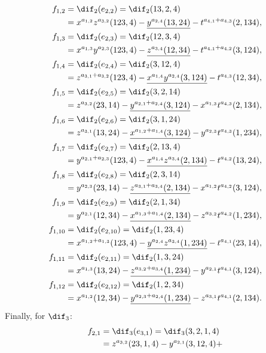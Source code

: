 \begin{example}
\begin{align*}
f_{1,2}&=  \dif_2(e_{2,2})=\dif_2(13,2,4)\\ 
&= x^{a_{1,2}}z^{a_{3,2}}(123,4)-\underline{y^{a_{2,4}}(13,24)}-
t^{a_{4,1}+a_{4,3}}(2,134),\\
f_{1,3}&= \dif_2(e_{2,3})=\dif_2(12,3,4)\\
&= x^{a_{1,3}}y^{a_{2,3}}(123,4)-\underline{z^{a_{3,4}}(12,34)}-
t^{a_{4,1}+a_{4,2}}(3,124),\\
f_{1,4}&=\dif_2(e_{2,4})=\dif_2(3,12,4)\\ 
&= z^{a_{3,1}+a_{3,2}}(123,4)-\underline{x^{a_{1,4}}y^{a_{2,4}}(3,124)}-
t^{a_{4,3}}(12,34),\\
f_{1,5}&= \dif_2(e_{2,5})=\dif_2(3,2,14)\\
&= z^{a_{3,2}}(23,14)-\underline{y^{a_{2,1}+a_{2,4}}(3,124)}-
x^{a_{1,3}}t^{a_{4,3}}(2,134),\\
f_{1,6}&= \dif_2(e_{2,6})=\dif_2(3,1,24)\\ 
&= z^{a_{3,1}}(13,24)-\underline{x^{a_{1,2}+a_{1,4}}(3,124)}-
y^{a_{2,3}}t^{a_{4,3}}(1,234),\\
f_{1,7}&= \dif_2(e_{2,7})=\dif_2(2,13,4)\\
&= y^{a_{2,1}+a_{2,3}}(123,4)-\underline{x^{a_{1,4}}z^{a_{3,4}}(2,134)}-
t^{a_{4,2}}(13,24),\\
f_{1,8}&= \dif_2(e_{2,8})=\dif_2(2,3,14)\\ 
&= y^{a_{2,3}}(23,14)-\underline{z^{a_{3,1}+a_{3,4}}(2,134)}-
x^{a_{1,2}}t^{a_{4,2}}(3,124),\\
f_{1,9}&= \dif_2(e_{2,9})=\dif_2(2,1,34)\\
&= y^{a_{2,1}}(12,34)-\underline{x^{a_{1,3}+a_{1,4}}(2,134)}-
z^{a_{3,2}}t^{a_{4,2}}(1,234),\\
f_{1,10}&= \dif_2(e_{2,10})=\dif_2(1,23,4)\\ 
&= x^{a_{1,2}+a_{1,3}}(123,4)-\underline{y^{a_{2,4}}z^{a_{3,4}}(1,234)}-
t^{a_{4,1}}(23,14),\\
f_{1,11}&=\dif_2(e_{2,11})=\dif_2(1,3,24)\\
&= x^{a_{1,3}}(13,24)-\underline{z^{a_{3,2}+a_{3,4}}(1,234)}-
y^{a_{2,1}}t^{a_{4,1}}(3,124),\\
f_{1,12}&= \dif_2(e_{2,12})=\dif_2(1,2,34)\\ 
&= x^{a_{1,2}}(12,34)-\underline{y^{a_{2,3}+a_{2,4}}(1,234)}-
z^{a_{3,1}}t^{a_{4,1}}(2,134).
\end{align*}
Finally, for $\dif_3$:
\begin{align*}
f_{2,1}&= \dif_3(e_{3,1})=
\dif_3(3,2,1,4)\\ &= z^{a_{3,2}}(23,1,4)-y^{a_{2,1}}(3,12,4)+

\end{align*}
\end{example}
